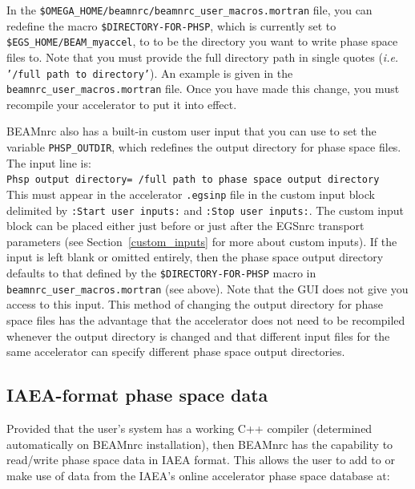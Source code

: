 \documentclass[12pt,twoside]{article}
\begin{document}
\begin{description}
\item
{}
In the {\tt \$OMEGA\_HOME/beamnrc/beamnrc\_user\_macros.mortran} file, you can
redefine the macro {\tt \$DIRECTORY-FOR-PHSP}, which
is currently set to {\tt \$EGS\_HOME/BEAM\_myaccel}, to
to be the directory you want to write phase space files to.  Note that you
must provide the full directory path in single quotes
({\em i.e.} {\tt '/full path to directory'}).  An example is given in
the {\tt beamnrc\_user\_macros.mortran} file.  Once you have made this
change, you must recompile your accelerator to put it into effect.

\item
{}
BEAMnrc also has a built-in custom user input that you can use
to set the variable {\tt PHSP\_OUTDIR}, which redefines the output
directory for phase space files.  The input line is:\\
{\tt Phsp output directory= /full path to phase space output directory}\\
This must appear in the accelerator {\tt .egsinp} file
in the custom input block delimited by
{\tt :Start user inputs:} and {\tt :Stop user inputs:}.
The custom input block can be placed either
just before or just after the EGSnrc transport parameters
(see Section~\ref{custom_inputs} for more about custom
inputs).  If the input is left blank or
omitted entirely, then the phase space output directory defaults
to that defined by the
{\tt \$DIRECTORY-FOR-PHSP} macro in {\tt beamnrc\_user\_macros.mortran} (see
above).  Note that the GUI does not give
you access to this input.  This method of changing the output
directory for phase space files has the advantage that the accelerator
does not need to be recompiled whenever the output directory is
changed and that different input files for the same accelerator
can specify different phase space output directories.

\end{description}

\subsection{IAEA-format phase space data}
\label{iaeasect}

Provided that the user's system has a working C++ compiler (determined
automatically on BEAMnrc installation), then BEAMnrc has the capability to
read/write phase space data in IAEA format.  This allows the user to
add to or make use of data from the IAEA's online accelerator phase space
database at:\\
\end{document}
